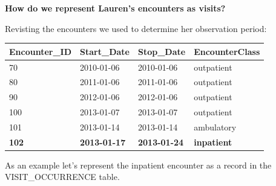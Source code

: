 \documentclass[]{book}
\begin{document}
\textbf{How do we represent Lauren's encounters as visits?}

Revisting the encounters we used to determine her observation period:

\begin{longtable}[]{@{}llll@{}}
\toprule
Encounter\_ID & Start\_Date & Stop\_Date & EncounterClass\tabularnewline
\midrule
\endhead
70 & 2010-01-06 & 2010-01-06 & outpatient\tabularnewline
80 & 2011-01-06 & 2011-01-06 & outpatient\tabularnewline
90 & 2012-01-06 & 2012-01-06 & outpatient\tabularnewline
100 & 2013-01-07 & 2013-01-07 & outpatient\tabularnewline
101 & 2013-01-14 & 2013-01-14 & ambulatory\tabularnewline
\textbf{102} & \textbf{2013-01-17} & \textbf{2013-01-24} &
\textbf{inpatient}\tabularnewline
\bottomrule
\end{longtable}

As an example let's represent the inpatient encounter as a record in the
VISIT\_OCCURRENCE table.
\end{document}
